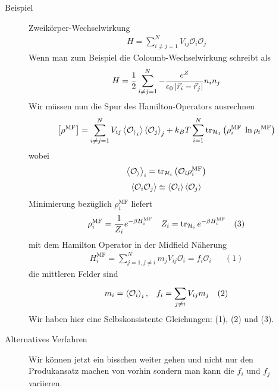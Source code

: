 \begin{description}
  \item[Beispiel] Zweikörper-Wechselwirkung
    \begin{align*}
      H = \sum_{i\neq j = 1}^{N} V_{ij} \mathcal{O}_i \mathcal{O}_j
    \end{align*}
    Wenn man zum Beispiel die Coloumb-Wechselwirkung schreibt als
    \begin{align*}
      H = \frac{1}{2}\sum_{i \neq j = 1}^{N} - \frac{e^Z}{\epsilon_0 \left| \vec{r}_i - \vec{r}_j \right|} n_i n_j
    \end{align*}
    Wir müssen nun die Spur des Hamilton-Operators ausrechnen
    \begin{align*}
      \left[ \rho^\text{MF} \right] = \sum_{i \neq j =1}^{N} V_{ij} \Braket{\mathcal{O_i}_i} \Braket{\mathcal{O}_j}_j
      + k_B T \sum_{i=1}^{N} \operatorname{tr}_{\mathcal{H}_1} \left( \rho_i^\text{MF } \ln{\rho_i}^\text{MF} \right)
    \end{align*}
    wobei
    \begin{align*}
      \Braket{\mathcal{O_i}}_i = \operatorname{tr}_{\mathcal{H}_i} \left( \mathcal{O}_i \rho_i^\text{MF} \right)
    \end{align*}
    \begin{align*}
      \Braket{\mathcal{O}_i \mathcal{O}_j} \simeq \Braket{\mathcal{O}_i}\Braket{\mathcal{O}_j}
    \end{align*}
    Minimierung bezüglich $\rho_i^\text{MF}$ liefert
    \begin{align*}
      \rho_i^\text{MF} = \frac{1}{Z_i} e^{- \beta H_i^\text{MF}} && Z_i = \operatorname{tr}_{\mathcal{H}_i} e ^{-\beta H_i^\text{MF}} && (3)
    \end{align*}
    mit dem Hamilton Operator in der Midfield Näherung 
    \begin{align*}
      H_i^\text{MF} = \sum_{j=1, j\neq i}^{N} m_j V_{ij} \mathcal{O}_i =  f_i \mathcal{O}_i  && (1)
    \end{align*}
    die mittleren Felder sind
    \begin{align*}
      m_i = \Braket{\mathcal{O}_i}_i,  && f_i = \sum_{j \neq i }^{}V_{ij} m_j && (2)
    \end{align*}
    Wir haben hier eine Selbskonsistente Gleichungen: (1), (2) und (3).
  \item[Alternatives Verfahren]
    Wir können jetzt ein bisschen weiter gehen und nicht nur den Produkansatz machen
    von vorhin sondern man kann die $f_i$ und $f_j$ variieren.

\end{description}
